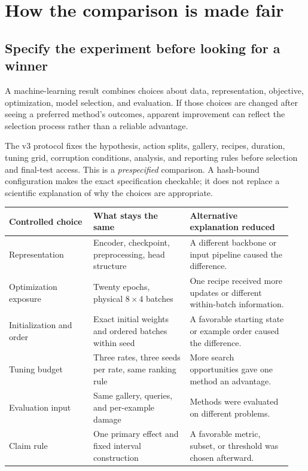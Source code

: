 \clearpage
\section{How the comparison is made fair}\label{sec:design}
\subsection{Specify the experiment before looking for a winner}
A machine-learning result combines choices about data, representation, objective,
optimization, model selection, and evaluation. If those choices are changed
after seeing a preferred method's outcomes, apparent improvement can reflect
the selection process rather than a reliable advantage.

The v3 protocol fixes the hypothesis, action splits, gallery, recipes, duration,
tuning grid, corruption conditions, analysis, and reporting rules before
selection and final-test access. This is a \emph{prespecified} comparison. A
hash-bound configuration makes the exact specification checkable; it does not
replace a scientific explanation of why the choices are appropriate.

\begin{longtable}{@{}P{0.28\linewidth}P{0.32\linewidth}P{0.34\linewidth}@{}}
\toprule Controlled choice & What stays the same & Alternative explanation reduced\\\midrule\endhead
Representation & Encoder, checkpoint, preprocessing, head structure & A different
backbone or input pipeline caused the difference.\\\addlinespace
Optimization exposure & Twenty epochs, physical $8\times4$ batches & One recipe
received more updates or different within-batch information.\\\addlinespace
Initialization and order & Exact initial weights and ordered batches within seed
& A favorable starting state or example order caused the difference.\\\addlinespace
Tuning budget & Three rates, three seeds per rate, same ranking rule & More search
opportunities gave one method an advantage.\\\addlinespace
Evaluation input & Same gallery, queries, and per-example damage & Methods were
evaluated on different problems.\\\addlinespace
Claim rule & One primary effect and fixed interval construction & A favorable
metric, subset, or threshold was chosen afterward.\\\bottomrule
\end{longtable}

